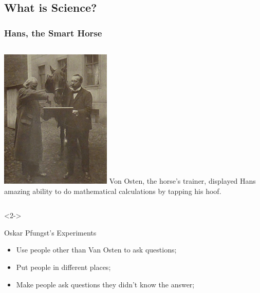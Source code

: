 \documentclass{beamer}
\begin{document}
\subsection{What is Science?}

\begin{frame}
  \frametitle{Hans, the Smart Horse}
  \begin{columns}[c]
    \includegraphics[width=\textwidth]{img/smarthorse}
    Von Osten, the horse's trainer, displayed Hans amazing ability to
    do mathematical calculations by tapping his hoof.
  \end{columns}
  \medskip

  \begin{onlyenv}<2->
    \begin{block}{Oskar Pfungst's Experiments}
      \begin{itemize}
      \item Use people other than Van Osten to ask questions;
      \item<3-> Put people in different places;
      \item<4-> Make people ask questions they didn't know the answer;
      \end{itemize}
    \end{block}
  \end{onlyenv}
\end{frame}
\end{document}
